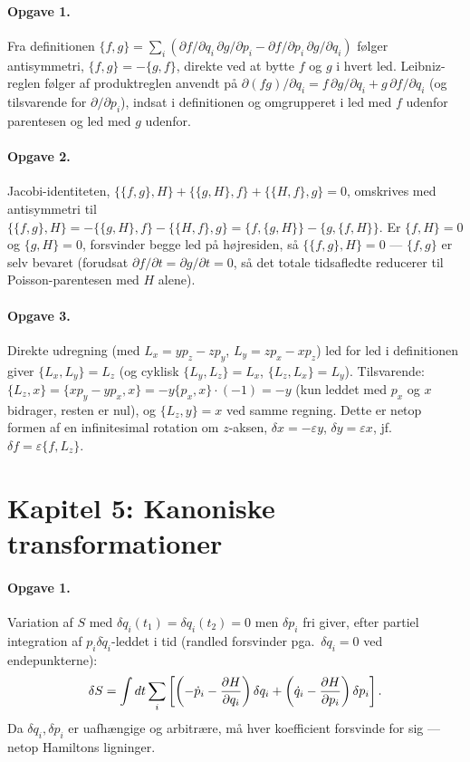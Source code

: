 \paragraph{Opgave 1.} Fra definitionen
$\{f,g\}=\sum_i(\partial f/\partial q_i\,\partial g/\partial p_i-\partial f/\partial p_i\,\partial g/\partial q_i)$
følger antisymmetri, $\{f,g\}=-\{g,f\}$, direkte ved at bytte $f$ og
$g$ i hvert led. Leibniz-reglen følger af produktreglen anvendt på
$\partial(fg)/\partial q_i=f\,\partial g/\partial q_i+g\,\partial f/\partial q_i$
(og tilsvarende for $\partial/\partial p_i$), indsat i definitionen og
omgrupperet i led med $f$ udenfor parentesen og led med $g$ udenfor.

\paragraph{Opgave 2.} Jacobi-identiteten,
$\{\{f,g\},H\}+\{\{g,H\},f\}+\{\{H,f\},g\}=0$, omskrives med
antisymmetri til $\{\{f,g\},H\}=-\{\{g,H\},f\}-\{\{H,f\},g\}=\{f,\{g,H\}\}-\{g,\{f,H\}\}$.
Er $\{f,H\}=0$ og $\{g,H\}=0$, forsvinder begge led på højresiden, så
$\{\{f,g\},H\}=0$ — $\{f,g\}$ er selv bevaret (forudsat
$\partial f/\partial t=\partial g/\partial t=0$, så det totale
tidsafledte reducerer til Poisson-parentesen med $H$ alene).

\paragraph{Opgave 3.} Direkte udregning (med
$L_x=yp_z-zp_y$, $L_y=zp_x-xp_z$) led for led i definitionen giver
$\{L_x,L_y\}=L_z$ (og cyklisk $\{L_y,L_z\}=L_x$, $\{L_z,L_x\}=L_y$).
Tilsvarende: $\{L_z,x\}=\{xp_y-yp_x,x\}=-y\{p_x,x\}\cdot(-1)=-y$ (kun
leddet med $p_x$ og $x$ bidrager, resten er nul), og
$\{L_z,y\}=x$ ved samme regning. Dette er netop formen af en
infinitesimal rotation om $z$-aksen, $\delta x=-\varepsilon y$,
$\delta y=\varepsilon x$, jf.\ $\delta f=\varepsilon\{f,L_z\}$.

\section*{Kapitel 5: Kanoniske transformationer}

\paragraph{Opgave 1.} Variation af $S$ med $\delta q_i(t_1)=\delta q_i(t_2)=0$
men $\delta p_i$ fri giver, efter partiel integration af
$p_i\delta\dot q_i$-leddet i tid (randled forsvinder pga.\
$\delta q_i=0$ ved endepunkterne):
\begin{equation*}
  \delta S = \int dt\sum_i\left[\left(-\dot p_i-\pdv{H}{q_i}\right)\delta q_i
    + \left(\dot q_i-\pdv{H}{p_i}\right)\delta p_i\right].
\end{equation*}
Da $\delta q_i,\delta p_i$ er uafhængige og arbitrære, må hver
koefficient forsvinde for sig — netop Hamiltons ligninger.

